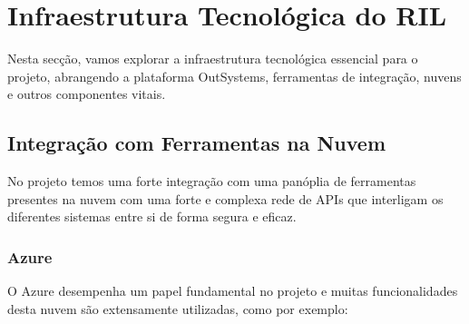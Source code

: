 \section{Infraestrutura Tecnológica do RIL}\label{sec:inf-tecnologias}

    Nesta secção, vamos explorar a infraestrutura tecnológica essencial para o projeto, abrangendo a plataforma OutSystems, ferramentas de integração, nuvens e outros componentes vitais.

        \subsection{Integração com Ferramentas na Nuvem}\label{secsec:azure-integracao}
        
        No projeto temos uma forte integração com uma panóplia de ferramentas presentes na nuvem com uma forte e complexa rede de APIs que interligam os diferentes sistemas entre si de forma segura e eficaz. 
        
        \subsubsection{Azure}\label{secsec:azure}

        O Azure desempenha um papel fundamental no projeto e muitas funcionalidades desta nuvem são extensamente utilizadas, como por exemplo:
        
